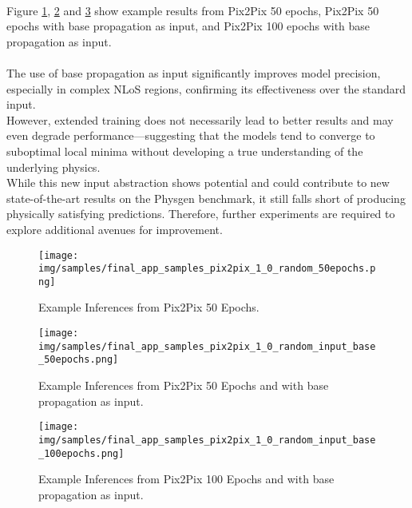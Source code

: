 		\\
		Figure \ref{fig:experiment_input_res_50}, \ref{fig:experiment_input_res_50_base_input} and \ref{fig:experiment_input_res_100_base_input} show example results from Pix2Pix 50 epochs, Pix2Pix 50 epochs with base propagation as input, and Pix2Pix 100 epochs with base propagation as input.\\
		\\
		The use of base propagation as input significantly improves model precision, especially in complex NLoS regions, confirming its effectiveness over the standard input.\\
		However, extended training does not necessarily lead to better results and may even degrade performance—suggesting that the models tend to converge to suboptimal local minima without developing a true understanding of the underlying physics.\\
		While this new input abstraction shows potential and could contribute to new state-of-the-art results on the Physgen benchmark, it still falls short of producing physically satisfying predictions. Therefore, further experiments are required to explore additional avenues for improvement.
		
		\begin{figure}[H]
			\centering
			\texttt{[image: img/samples/final\_app\_samples\_pix2pix\_1\_0\_random\_50epochs.png]}
			\caption[Example Inferences from Pix2Pix 50 Epochs.]{Example Inferences from Pix2Pix 50 Epochs.}
			\label{fig:experiment_input_res_50}
		\end{figure}
		\FloatBarrier
		
		\begin{figure}[H]
			\centering
			\texttt{[image: img/samples/final\_app\_samples\_pix2pix\_1\_0\_random\_input\_base\_50epochs.png]}
			\caption[Example Inferences from Pix2Pix 50 Epochs and with base propagation as input.]{Example Inferences from Pix2Pix 50 Epochs and with base propagation as input.}
			\label{fig:experiment_input_res_50_base_input}
		\end{figure}
		\FloatBarrier
		
		\begin{figure}[H]
			\centering
			\texttt{[image: img/samples/final\_app\_samples\_pix2pix\_1\_0\_random\_input\_base\_100epochs.png]}
			\caption[Example Inferences from Pix2Pix 100 Epochs and with base propagation as input.]{Example Inferences from Pix2Pix 100 Epochs and with base propagation as input.}
			\label{fig:experiment_input_res_100_base_input}
		\end{figure}
		\FloatBarrier
		
